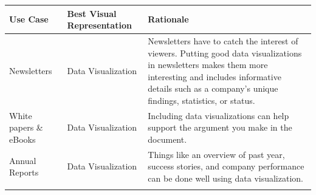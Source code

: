 \documentclass[]{book}
\begin{document}
\begin{longtable}[]{@{}lll@{}}
\toprule
\begin{minipage}[b]{0.08\columnwidth}\raggedright
Use Case\strut
\end{minipage} & \begin{minipage}[b]{0.26\columnwidth}\raggedright
Best Visual Representation\strut
\end{minipage} & \begin{minipage}[b]{0.58\columnwidth}\raggedright
Rationale\strut
\end{minipage}\tabularnewline
\midrule
\endhead
\begin{minipage}[t]{0.08\columnwidth}\raggedright
Newsletters\strut
\end{minipage} & \begin{minipage}[t]{0.26\columnwidth}\raggedright
Data Visualization\strut
\end{minipage} & \begin{minipage}[t]{0.58\columnwidth}\raggedright
Newsletters have to catch the interest of viewers. Putting good data visualizations in newsletters makes them more interesting and includes informative details such as a company's unique findings, statistics, or status.\strut
\end{minipage}\tabularnewline
\begin{minipage}[t]{0.08\columnwidth}\raggedright
White papers \& eBooks\strut
\end{minipage} & \begin{minipage}[t]{0.26\columnwidth}\raggedright
Data Visualization\strut
\end{minipage} & \begin{minipage}[t]{0.58\columnwidth}\raggedright
Including data visualizations can help support the argument you make in the document.\strut
\end{minipage}\tabularnewline
\begin{minipage}[t]{0.08\columnwidth}\raggedright
Annual Reports\strut
\end{minipage} & \begin{minipage}[t]{0.26\columnwidth}\raggedright
Data Visualization\strut
\end{minipage} & \begin{minipage}[t]{0.58\columnwidth}\raggedright
Things like an overview of past year, success stories, and company performance can be done well using data visualization.\strut
\end{minipage}\tabularnewline
\begin{minipage}[t]{0.08\columnwidth}\raggedright

\end{minipage}
\end{longtable}
\end{document}
